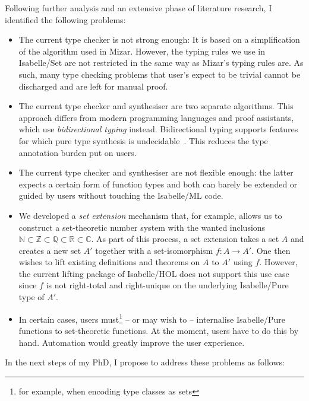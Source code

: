 \documentclass[a4paper, 12pt]{article}
\theoremstyle{plain}
\theoremstyle{definition}
\begin{document}
Following further analysis and an extensive phase of literature research,
I identified the following problems:
\begin{itemize}
  \item The current type checker is not strong enough:
    It is based on a simplification of the algorithm used in Mizar.
    However, the typing rules we use in Isabelle/Set are not restricted
    in the same way as Mizar's typing rules are.
    As such, many type checking problems that user's expect to
    be trivial cannot be discharged and are left for manual proof.
  \item The current type checker and synthesiser are two separate algorithms.
    This approach differs from modern programming languages and proof assistants,
    which use \emph{bidirectional typing} instead.
    Bidirectional typing supports features for which pure type synthesis
    is undecidable~\cite{bidirectional}.
    This reduces the type annotation burden put on users.
  \item The current type checker and synthesiser are not flexible enough:
    the latter expects a certain form of function types and both
    can barely be extended or guided by users without touching the Isabelle/ML code.
  \item We developed a \emph{set extension} mechanism that,
    for example, allows us to construct a set-theoretic number system
    with the wanted inclusions $\mathbb{N}\subset\mathbb{Z}\subset\mathbb{Q}\subset\mathbb{R}\subset\mathbb{C}$.
    As part of this process, a set extension takes a set $A$ and
    creates a new set $A'$ together with a set-isomorphism $f : A\to A'$.
    One then wishes to lift existing definitions and theorems on $A$ to $A'$ using $f$.
    However, the current lifting package of Isabelle/HOL does not support this use case since $f$ is not right-total and right-unique on the underlying Isabelle/Pure type of $A'$.
  \item
    In certain cases,
    users must\footnote{for example, when encoding type classes as sets} -- or may wish to -- internalise Isabelle/Pure functions to set-theoretic functions.
    At the moment, users have to do this by hand.
    Automation would greatly improve the user experience.
\end{itemize}
In the next steps of my PhD, I propose to address these problems as follows:
\end{document}
